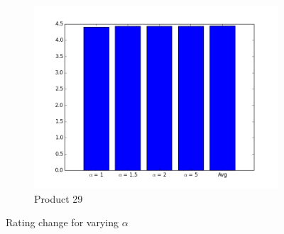 \documentclass{article}
\begin{document}
\begin{figure}[htp]
\begin{subfigure}{0.5\textwidth}
\centering
\includegraphics[width=1\textwidth]{Graphs/Product29}
\caption{Product 29}
\label{fig:product29}
\end{subfigure}
\caption{Rating change for varying $\alpha$}
\label{fig:plots_varying_alpha}
\end{figure}
\end{document}

